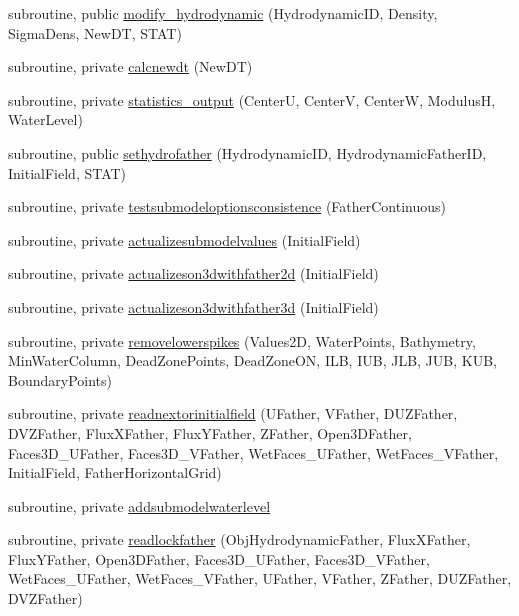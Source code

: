 \begin{DoxyCompactItemize}
subroutine, public \mbox{\hyperlink{namespacemodulehydrodynamic_a54656696e009a87a266514744beb5baa}{modify\+\_\+hydrodynamic}} (Hydrodynamic\+ID, Density, Sigma\+Dens, New\+DT, S\+T\+AT)
\item 
subroutine, private \mbox{\hyperlink{namespacemodulehydrodynamic_a63b7d9d86f7746faae381352cdb4ceda}{calcnewdt}} (New\+DT)
\item 
subroutine, private \mbox{\hyperlink{namespacemodulehydrodynamic_ab12f940af5dec2fe8ed4767b7a50fc07}{statistics\+\_\+output}} (CenterU, CenterV, CenterW, ModulusH, Water\+Level)
\item 
subroutine, public \mbox{\hyperlink{namespacemodulehydrodynamic_abc9bf4137583800ad278abc052b5de37}{sethydrofather}} (Hydrodynamic\+ID, Hydrodynamic\+Father\+ID, Initial\+Field, S\+T\+AT)
\item 
subroutine, private \mbox{\hyperlink{namespacemodulehydrodynamic_ab0672dab245838d200adce9cad0f729e}{testsubmodeloptionsconsistence}} (Father\+Continuous)
\item 
subroutine, private \mbox{\hyperlink{namespacemodulehydrodynamic_a6c99419ab0bd5db0c25f899c10d86020}{actualizesubmodelvalues}} (Initial\+Field)
\item 
subroutine, private \mbox{\hyperlink{namespacemodulehydrodynamic_a22559e3146696632ddf4733faac3f167}{actualizeson3dwithfather2d}} (Initial\+Field)
\item 
subroutine, private \mbox{\hyperlink{namespacemodulehydrodynamic_af75db98fe37a03b0a927c6e2799e2b13}{actualizeson3dwithfather3d}} (Initial\+Field)
\item 
subroutine, private \mbox{\hyperlink{namespacemodulehydrodynamic_aa08df6c812db6e473c13d11473d2c1ad}{removelowerspikes}} (Values2D, Water\+Points, Bathymetry, Min\+Water\+Column, Dead\+Zone\+Points, Dead\+Zone\+ON, I\+LB, I\+UB, J\+LB, J\+UB, K\+UB, Boundary\+Points)
\item 
subroutine, private \mbox{\hyperlink{namespacemodulehydrodynamic_af6d2413608971031e8650e99548abfc7}{readnextorinitialfield}} (U\+Father, V\+Father, D\+U\+Z\+Father, D\+V\+Z\+Father, Flux\+X\+Father, Flux\+Y\+Father, Z\+Father, Open3\+D\+Father, Faces3\+D\+\_\+\+U\+Father, Faces3\+D\+\_\+\+V\+Father, Wet\+Faces\+\_\+\+U\+Father, Wet\+Faces\+\_\+\+V\+Father, Initial\+Field, Father\+Horizontal\+Grid)
\item 
subroutine, private \mbox{\hyperlink{namespacemodulehydrodynamic_aab2200414765344d596b6ebaadc2fa4a}{addsubmodelwaterlevel}}
\item 
subroutine, private \mbox{\hyperlink{namespacemodulehydrodynamic_afdbd6a69d8a99bcbad6b5c090639bc1b}{readlockfather}} (Obj\+Hydrodynamic\+Father, Flux\+X\+Father, Flux\+Y\+Father, Open3\+D\+Father, Faces3\+D\+\_\+\+U\+Father, Faces3\+D\+\_\+\+V\+Father, Wet\+Faces\+\_\+\+U\+Father, Wet\+Faces\+\_\+\+V\+Father, U\+Father, V\+Father, Z\+Father, D\+U\+Z\+Father, D\+V\+Z\+Father)

\end{DoxyCompactItemize}
